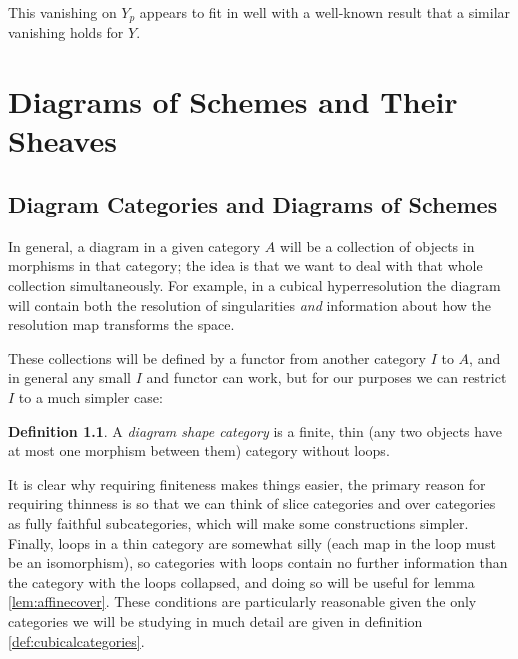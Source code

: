 \documentclass[proquest]{uwthesis}[2014/11/13]
\theoremstyle{definition}
\newtheorem{definition}[theorem]{Definition}
\begin{document}
This vanishing on $Y_p$ appears to fit in well with a well-known result that a similar vanishing holds for $Y$.



\chapter{Diagrams of Schemes and Their Sheaves}
\label{chp:diagrams}
\section{Diagram Categories and Diagrams of Schemes}
In general, a diagram in a given category $A$ will be a collection of objects in morphisms in that category; the idea is that we want to deal with that whole collection simultaneously. For example, in a cubical hyperresolution the diagram will contain both the resolution of singularities \textit{and} information about how the resolution map transforms the space.

These collections will be defined by a functor from another category $I$ to $A$, and in general any small $I$ and functor can work, but for our purposes we can restrict $I$ to a much simpler case:
\begin{definition}
	A \textit{diagram shape category} is a finite, thin (any two objects have at most one morphism between them) category without loops.
\end{definition}

It is clear why requiring finiteness makes things easier, the primary reason for requiring thinness is so that we can think of slice categories and over categories as fully faithful subcategories, which will make some constructions simpler.
Finally, loops in a thin category are somewhat silly (each map in the loop must be an isomorphism), so categories with loops contain no further information than the category with the loops collapsed, and doing so will be useful for lemma \ref{lem:affinecover}.
These conditions are particularly reasonable given the only categories we will be studying in much detail are given in definition \ref{def:cubicalcategories}.
\end{document}
